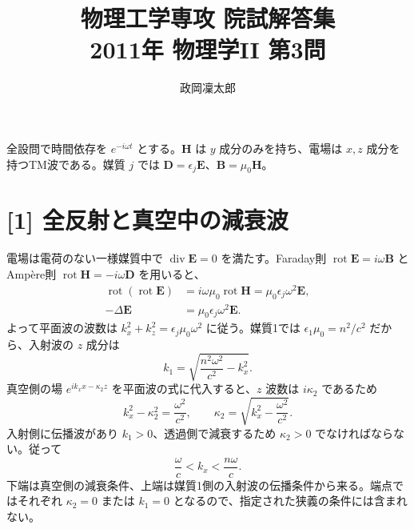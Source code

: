 \documentclass[11pt,a4paper]{article}
\title{物理工学専攻 院試解答集\\2011年 物理学II 第3問}
\author{政岡凜太郎}
\date{}
\begin{document}
\maketitle

全設問で時間依存を $e^{-i\omega t}$ とする。$\boldsymbol H$ は $y$ 成分のみを持ち、電場は $x,z$ 成分を持つTM波である。媒質 $j$ では $\boldsymbol D=\epsilon_j\boldsymbol E$、$\boldsymbol B=\mu_0\boldsymbol H$。

\section*{[1] 全反射と真空中の減衰波}
電場は電荷のない一様媒質中で $\operatorname{div}\boldsymbol E=0$ を満たす。Faraday則 $\operatorname{rot}\boldsymbol E=i\omega\boldsymbol B$ と Amp\`ere則 $\operatorname{rot}\boldsymbol H=-i\omega\boldsymbol D$ を用いると、
\begin{align}
  \operatorname{rot}(\operatorname{rot}\boldsymbol E)
  &=i\omega\mu_0\operatorname{rot}\boldsymbol H
   =\mu_0\epsilon_j\omega^2\boldsymbol E,\\
  -\Delta\boldsymbol E&=\mu_0\epsilon_j\omega^2\boldsymbol E.
\end{align}
よって平面波の波数は $k_x^2+k_z^2=\epsilon_j\mu_0\omega^2$ に従う。媒質1では $\epsilon_1\mu_0=n^2/c^2$ だから、入射波の $z$ 成分は
\begin{equation}
  \boxed{k_1=\sqrt{\frac{n^2\omega^2}{c^2}-k_x^2}}.
\end{equation}
真空側の場 $e^{ik_xx-\kappa_2z}$ を平面波の式に代入すると、$z$ 波数は $i\kappa_2$ であるため
\begin{equation}
  k_x^2-\kappa_2^2=\frac{\omega^2}{c^2},\qquad
  \boxed{\kappa_2=\sqrt{k_x^2-\frac{\omega^2}{c^2}}}.
\end{equation}
入射側に伝播波があり $k_1>0$、透過側で減衰するため $\kappa_2>0$ でなければならない。従って
\begin{equation}
  \boxed{\frac{\omega}{c}<k_x<\frac{n\omega}{c}}.
\end{equation}
下端は真空側の減衰条件、上端は媒質1側の入射波の伝播条件から来る。端点ではそれぞれ $\kappa_2=0$ または $k_1=0$ となるので、指定された狭義の条件には含まれない。
\end{document}
